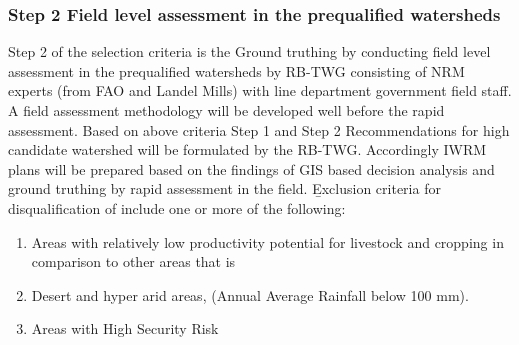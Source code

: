 \subsubsection{Step 2 Field level assessment in the prequalified watersheds}
Step 2 of the selection criteria is the Ground truthing by conducting field level assessment in the prequalified watersheds by RB-TWG consisting of NRM experts (from FAO and Landel Mills) with line department government field staff. A field assessment methodology will be developed well before the rapid assessment.
Based on above criteria Step 1 and Step 2 Recommendations for high candidate watershed will be formulated by the RB-TWG. Accordingly IWRM plans will be prepared based on the findings of GIS based decision analysis and ground truthing by rapid assessment in the field.
\b{Exclusion criteria for disqualification of include one or more of the following: }
\begin{enumerate}
	\item Areas with relatively low productivity potential for livestock and cropping in comparison to other areas that is %
	\item Desert and hyper arid areas, (Annual Average Rainfall below 100 mm).
	\item Areas with High Security Risk
	
\end{enumerate}